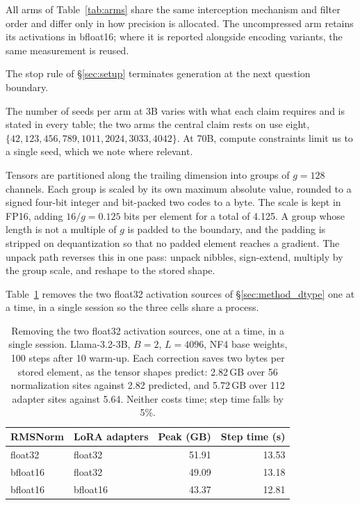 \documentclass[11pt,letterpaper]{article}
\begin{document}
All arms of Table~\ref{tab:arms} share the same interception mechanism and filter order and differ only in how precision is allocated. The uncompressed arm retains its activations in bfloat16; where it is reported alongside encoding variants, the same measurement is reused.

The stop rule of \S\ref{sec:setup} terminates generation at the next question boundary.

The number of seeds per arm at 3B varies with what each claim requires and is stated in every table; the two arms the central claim rests on use eight, $\{42, 123, 456, 789, 1011, 2024, 3033, 4042\}$. At 70B, compute constraints limit us to a single seed, which we note where relevant.

\medskip
Tensors are partitioned along the trailing dimension into groups of $g = 128$ channels. Each group is scaled by its own maximum absolute value, rounded to a signed four-bit integer and bit-packed two codes to a byte. The scale is kept in FP16, adding $16/g = 0.125$ bits per element for a total of 4.125. A group whose length is not a multiple of $g$ is padded to the boundary, and the padding is stripped on dequantization so that no padded element reaches a gradient. The unpack path reverses this in one pass: unpack nibbles, sign-extend, multiply by the group scale, and reshape to the stored shape.

\medskip
Table~\ref{tab:dtype} removes the two float32 activation sources of \S\ref{sec:method_dtype} one at a time, in a single session so the three cells share a process.

\begin{table}[htbp]
\centering
\small
\caption{Removing the two float32 activation sources, one at a time, in a single session. Llama-3.2-3B, $B{=}2$, $L{=}4096$, NF4 base weights, 100 steps after 10 warm-up. Each correction saves two bytes per stored element, as the tensor shapes predict: 2.82\,GB over 56 normalization sites against 2.82 predicted, and 5.72\,GB over 112 adapter sites against 5.64. Neither costs time; step time falls by 5\%.}
\label{tab:dtype}
\begin{tabular}{llrr}
\toprule
RMSNorm & LoRA adapters & Peak (GB) & Step time (s) \\
\midrule
float32 & float32  & 51.91 & 13.53 \\
bfloat16 & float32 & 49.09 & 13.18 \\
bfloat16 & bfloat16 & 43.37 & 12.81 \\
\bottomrule
\end{tabular}
\end{table}
\end{document}
